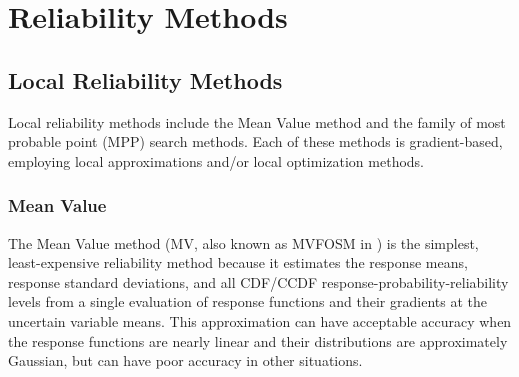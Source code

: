 \chapter{Reliability Methods}\label{uq:reliability}



\section{Local Reliability Methods}\label{uq:reliability:local}

Local reliability methods include the Mean Value method and the family
of most probable point (MPP) search methods.  Each of these methods is
gradient-based, employing local approximations and/or local
optimization methods.


\subsection{Mean Value}\label{uq:reliability:local:mv}

The Mean Value method (MV, also known as MVFOSM in \cite{Hal00}) is
the simplest, least-expensive reliability method because it estimates
the response means, response standard deviations, and all CDF/CCDF
response-probability-reliability levels from a single evaluation of
response functions and their gradients at the uncertain variable
means.  This approximation can have acceptable accuracy when the
response functions are nearly linear and their distributions are
approximately Gaussian, but can have poor accuracy in other
situations.

